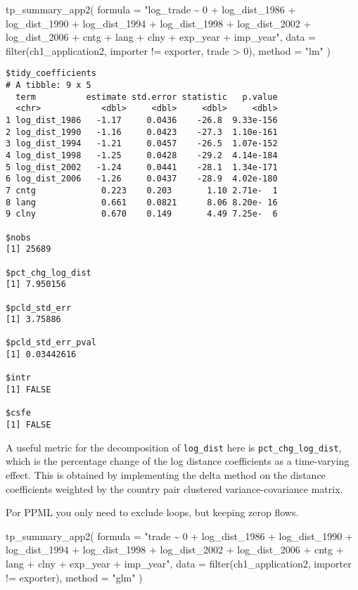 \documentclass[12pt,reqno,oneside,pdftex]{formato-puc/puctesis} %
\newenvironment{Shaded}{\begin{snugshade}}{\end{snugshade}}
\newcommand{\AttributeTok}[1]{\textcolor[rgb]{0.77,0.63,0.00}{#1}}
\newcommand{\DecValTok}[1]{\textcolor[rgb]{0.00,0.00,0.81}{#1}}
\newcommand{\FunctionTok}[1]{\textcolor[rgb]{0.00,0.00,0.00}{#1}}
\newcommand{\NormalTok}[1]{#1}
\newcommand{\SpecialCharTok}[1]{\textcolor[rgb]{0.00,0.00,0.00}{#1}}
\newcommand{\StringTok}[1]{\textcolor[rgb]{0.31,0.60,0.02}{#1}}
\begin{document}
\begin{Shaded}
\begin{Highlighting}[]
\FunctionTok{tp\_summary\_app2}\NormalTok{(}
  \AttributeTok{formula =} \StringTok{"log\_trade \textasciitilde{} 0 + log\_dist\_1986 + log\_dist\_1990 + log\_dist\_1994 +}
\StringTok{    log\_dist\_1998 + log\_dist\_2002 + log\_dist\_2006 + cntg +}
\StringTok{    lang + clny + exp\_year + imp\_year"}\NormalTok{,}
  \AttributeTok{data =} \FunctionTok{filter}\NormalTok{(ch1\_application2, importer }\SpecialCharTok{!=}\NormalTok{ exporter, trade }\SpecialCharTok{\textgreater{}} \DecValTok{0}\NormalTok{),}
  \AttributeTok{method =} \StringTok{"lm"}
\NormalTok{)}
\end{Highlighting}
\end{Shaded}

\begin{verbatim}
$tidy_coefficients
# A tibble: 9 x 5
  term          estimate std.error statistic   p.value
  <chr>            <dbl>     <dbl>     <dbl>     <dbl>
1 log_dist_1986   -1.17     0.0436    -26.8  9.33e-156
2 log_dist_1990   -1.16     0.0423    -27.3  1.10e-161
3 log_dist_1994   -1.21     0.0457    -26.5  1.07e-152
4 log_dist_1998   -1.25     0.0428    -29.2  4.14e-184
5 log_dist_2002   -1.24     0.0441    -28.1  1.34e-171
6 log_dist_2006   -1.26     0.0437    -28.9  4.02e-180
7 cntg             0.223    0.203       1.10 2.71e-  1
8 lang             0.661    0.0821      8.06 8.20e- 16
9 clny             0.670    0.149       4.49 7.25e-  6

$nobs
[1] 25689

$pct_chg_log_dist
[1] 7.950156

$pcld_std_err
[1] 3.75886

$pcld_std_err_pval
[1] 0.03442616

$intr
[1] FALSE

$csfe
[1] FALSE
\end{verbatim}

A useful metric for the decomposition of \texttt{log\_dist} here is
\texttt{pct\_chg\_log\_dist}, which is the percentage change of the log
distance coefficients as a time-varying effect. This is obtained by
implementing the delta method on the distance coefficients weighted by
the country pair clustered variance-covariance matrix.

Por PPML you only need to exclude loops, but keeping zerop flows.

\begin{Shaded}
\begin{Highlighting}[]
\FunctionTok{tp\_summary\_app2}\NormalTok{(}
  \AttributeTok{formula =} \StringTok{"trade \textasciitilde{} 0 + log\_dist\_1986 + log\_dist\_1990 +}
\StringTok{    log\_dist\_1994 + log\_dist\_1998 + log\_dist\_2002 + log\_dist\_2006 +}
\StringTok{    cntg + lang + clny + exp\_year + imp\_year"}\NormalTok{,}
  \AttributeTok{data =} \FunctionTok{filter}\NormalTok{(ch1\_application2, importer }\SpecialCharTok{!=}\NormalTok{ exporter),}
  \AttributeTok{method =} \StringTok{"glm"}
\NormalTok{)}
\end{Highlighting}
\end{Shaded}
\end{document}
